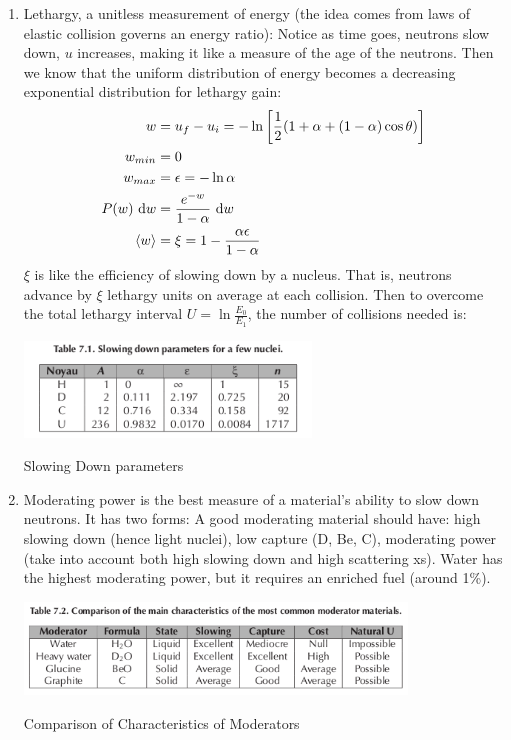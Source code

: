 \documentclass{school-22.211-notes}
\begin{document}
\begin{enumerate}
\item Lethargy, a unitless measurement of energy (the idea comes from laws of elastic collision governs an energy ratio):
Notice as time goes, neutrons slow down, $u$ increases, making it like a measure of the age of the neutrons. Then we know that the uniform distribution of energy becomes a decreasing exponential distribution for lethargy gain: 
\begin{align}
w &= u_f - u_i = -\ln \left[ \frac{1}{2} ( 1 + \alpha + (1-\alpha) \cos \theta ) \right] \\
w_{min} &= 0 \\
w_{max} &= \epsilon = -\ln \alpha \\
P(w) \mbox{ }\mathrm{d} w &= \frac{e^{-w}}{1 - \alpha} \mbox{ }\mathrm{d} w \\
\left< w \right> &= \xi = 1 - \frac{\alpha \epsilon}{1 - \alpha} 
\end{align}
$\xi$ is like the efficiency of slowing down by a nucleus. That is, neutrons advance by $\xi$ lethargy units on average at each collision. Then to overcome the total lethargy interval $U = \ln \frac{E_0}{E_1}$, the number of collisions needed is:
\begin{table}
  \centering
  \includegraphics[width=3in]{images/sl-d/slowing-down-parameter.png}
  \caption{Slowing Down parameters}\label{slowing-down-parameter}
\end{table}

\item Moderating power is the best measure of a material's ability to slow down neutrons. It has two forms:
A good moderating material should have: high slowing down (hence light nuclei), low capture (D, Be, C), moderating power (take into account both high slowing down and high scattering xs). Water has the highest moderating power, but it requires an enriched fuel (around 1\%). 
\begin{table}
  \centering
  \includegraphics[width=4in]{images/sl-d/moderator-comparison.png}
  \caption{Comparison of Characteristics of Moderators}\label{moderator-comparison}
\end{table}


\end{enumerate}
\end{document}
